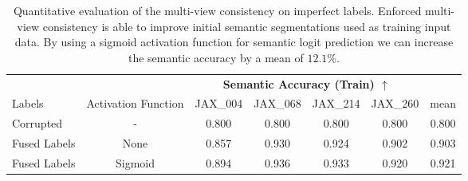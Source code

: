\begin{table*}[t]
	\centering
	\begin{tabular}{l|c|cccc|c}
		\toprule
		& & \multicolumn{4}{c}{\textbf{Semantic Accuracy (Train) $\uparrow$}} &  \\
		Labels & Activation Function & JAX\_004&JAX\_068&JAX\_214&JAX\_260& mean\\
		\midrule
		
		Corrupted & - & 0.800 & 0.800 & 0.800 & 0.800 & 0.800\\
		
		Fused Labels & None & 0.857 &  0.930 & 0.924 & 0.902 & 0.903\\
		
		Fused Labels & Sigmoid & 0.894 &  0.936 & 0.933 & 0.920 & 0.921\\
		
		\bottomrule
	\end{tabular}
	\caption{
		Quantitative evaluation of the multi-view consistency on imperfect labels.
		Enforced multi-view consistency is able to improve initial semantic segmentations used as training input data. By using a sigmoid activation function for semantic logit prediction we can increase the semantic accuracy by a mean of $12.1\%$. }
	\label{tbl:corrupted_labels}
\end{table*}



